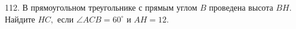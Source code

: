 112. В прямоугольном треугольнике с прямым углом $B$ проведена высота $BH.$ Найдите $HC,$ если $\angle ACB=60^\circ$ и $AH=12.$\\
